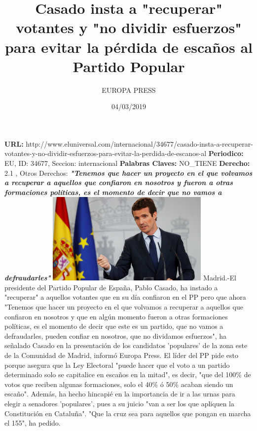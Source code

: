 \documentclass{article}%
\title{\textbf{Casado insta a "recuperar" votantes y "no dividir esfuerzos" para evitar la pérdida de escaños al Partido Popular}}%
\author{EUROPA PRESS}%
\date{04/03/2019}%
\begin{document}
%
\normalsize%
\maketitle%
\textbf{URL: }%
http://www.eluniversal.com/internacional/34677/casado{-}insta{-}a{-}recuperar{-}votantes{-}y{-}no{-}dividir{-}esfuerzos{-}para{-}evitar{-}la{-}perdida{-}de{-}escanos{-}al\newline%
%
\textbf{Periodico: }%
EU, %
ID: %
34677, %
Seccion: %
internacional\newline%
%
\textbf{Palabras Claves: }%
NO\_TIENE\newline%
%
\textbf{Derecho: }%
2.1%
, Otros Derechos: %
\newline%
%
\textbf{\textit{"Tenemos que hacer un proyecto en el que volvamos a recuperar a aquellos que confiaron en nosotros y fueron a otras formaciones políticas, es el momento de decir que no vamos a defraudarles"}}%
\newline%
\newline%
%
\includegraphics[width=300px]{EU_34677.jpg}%
\newline%
%
Madrid.{-}El presidente del Partido Popular de España, Pablo Casado, ha instado a "recuperar" a aquellos votantes que en su día confiaron en el PP pero que ahora%
\newline%
%
"Tenemos que hacer un proyecto en el que volvamos a recuperar a aquellos que confiaron en nosotros y que en algún momento fueron a otras formaciones políticas, es el momento de decir que este es un partido, que no vamos a defraudarles, pueden confiar en nosotros, que no dividamos esfuerzos", ha señalado Casado en la presentación de los candidatos 'populares' de la zona este de la Comunidad de Madrid, informó Europa Press.%
\newline%
%
El líder del PP pide esto porque asegura que la Ley Electoral "puede hacer que el voto a un partido determinado solo se capitalice en escaños en la mitad", es decir, "que del 100\% de votos que reciben algunas formaciones, solo el 40\% ó 50\% acaban siendo un escaño".%
\newline%
%
Además, ha hecho hincapié en la importancia de ir a las urnas para elegir a senadores 'populares', pues a su juicio "van a ser los que apliquen la Constitución en Cataluña". "Que la cruz sea para aquellos que pongan en marcha el 155", ha pedido.%
\newline%
%
\end{document}
